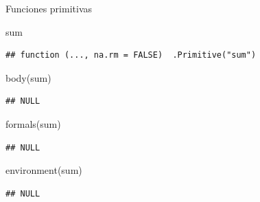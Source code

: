 \documentclass[
  ignorenonframetext,
]{beamer}
\newenvironment{Shaded}{\begin{snugshade}}{\end{snugshade}}
\newcommand{\FunctionTok}[1]{\textcolor[rgb]{0.00,0.00,0.00}{#1}}
\newcommand{\NormalTok}[1]{#1}
\begin{document}
\begin{frame}[fragile]{Funciones primitivas}
\protect\hypertarget{funciones-primitivas}{}
\begin{Shaded}
\begin{Highlighting}[]
\NormalTok{sum}
\end{Highlighting}
\end{Shaded}

\begin{verbatim}
## function (..., na.rm = FALSE)  .Primitive("sum")
\end{verbatim}

\begin{Shaded}
\begin{Highlighting}[]
\FunctionTok{body}\NormalTok{(sum)}
\end{Highlighting}
\end{Shaded}

\begin{verbatim}
## NULL
\end{verbatim}

\begin{Shaded}
\begin{Highlighting}[]
\FunctionTok{formals}\NormalTok{(sum)}
\end{Highlighting}
\end{Shaded}

\begin{verbatim}
## NULL
\end{verbatim}

\begin{Shaded}
\begin{Highlighting}[]
\FunctionTok{environment}\NormalTok{(sum)}
\end{Highlighting}
\end{Shaded}

\begin{verbatim}
## NULL
\end{verbatim}
\end{frame}
\end{document}

